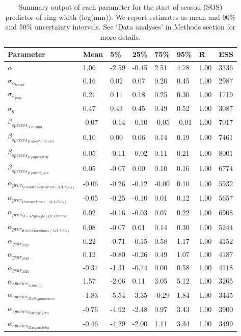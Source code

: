 \documentclass{article}\usepackage[]{graphicx}\usepackage[]{xcolor}
\begin{document}
\begin{table}[ht]
\centering
\caption{Summary output of each parameter for the start of season (SOS) predictor of ring width (log(mm)). We report estimates as mean and 90\% and 50\% uncertainty intervals. See `Data analyses' in Methods section for more details.} 
\label{tab:tab_SOS}
\begin{tabular}{llllllll}
  \hline
Parameter & Mean & 5\% & 25\% & 75\% & 95\% & \^R & ESS \\ 
  \hline
$\alpha$ & 1.06 & -2.59 & -0.45 & 2.51 & 4.78 & 1.00 & 3336 \\ 
  $\sigma_{\alpha_{treeid}}$ & 0.16 & 0.02 & 0.07 & 0.20 & 0.45 & 1.00 & 2987 \\ 
  $\sigma_{\alpha_{prov}}$ & 0.21 & 0.11 & 0.18 & 0.25 & 0.30 & 1.00 & 1719 \\ 
  $\sigma_{y}$ & 0.47 & 0.43 & 0.45 & 0.49 & 0.52 & 1.00 & 3087 \\ 
  $\beta_{species_{A. incana}}$ & -0.07 & -0.14 & -0.10 & -0.05 & -0.01 & 1.00 & 7017 \\ 
  $\beta_{species_{B. alleghaniensis}}$ & 0.10 & 0.00 & 0.06 & 0.14 & 0.19 & 1.00 & 7461 \\ 
  $\beta_{species_{B. papyrifera}}$ & 0.05 & -0.11 & -0.02 & 0.11 & 0.21 & 1.00 & 8001 \\ 
  $\beta_{species_{B. populifolia}}$ & 0.05 & -0.07 & 0.00 & 0.10 & 0.16 & 1.00 & 6774 \\ 
  $\alpha_{prov_{Second College Grant (NH, USA)}}$ & -0.06 & -0.26 & -0.12 & -0.00 & 0.10 & 1.00 & 5932 \\ 
  $\alpha_{prov_{Harvard Forest (MA, USA)}}$ & -0.05 & -0.25 & -0.10 & 0.01 & 0.12 & 1.00 & 5657 \\ 
  $\alpha_{prov_{St-Hippolyte (Qc, Canada)}}$ & 0.02 & -0.16 & -0.03 & 0.07 & 0.22 & 1.00 & 6908 \\ 
  $\alpha_{prov_{White Mountains (NH, USA)}}$ & 0.08 & -0.07 & 0.01 & 0.14 & 0.30 & 1.00 & 5244 \\ 
  $\alpha_{year_{2018}}$ & 0.22 & -0.71 & -0.15 & 0.58 & 1.17 & 1.00 & 4152 \\ 
  $\alpha_{year_{2019}}$ & 0.12 & -0.80 & -0.26 & 0.49 & 1.07 & 1.00 & 4187 \\ 
  $\alpha_{year_{2020}}$ & -0.37 & -1.31 & -0.74 & 0.00 & 0.58 & 1.00 & 4118 \\ 
  $\alpha_{species_{A. incana}}$ & 1.57 & -2.06 & 0.11 & 3.05 & 5.12 & 1.00 & 3265 \\ 
  $\alpha_{species_{B. alleghaniensis}}$ & -1.83 & -5.54 & -3.35 & -0.29 & 1.84 & 1.00 & 3445 \\ 
  $\alpha_{species_{B. papyrifera}}$ & -0.76 & -4.92 & -2.48 & 0.97 & 3.43 & 1.00 & 3900 \\ 
  $\alpha_{species_{B. populifolia}}$ & -0.46 & -4.29 & -2.00 & 1.11 & 3.34 & 1.00 & 3499 \\ 
   \hline
\end{tabular}
\end{table}
\end{document}
